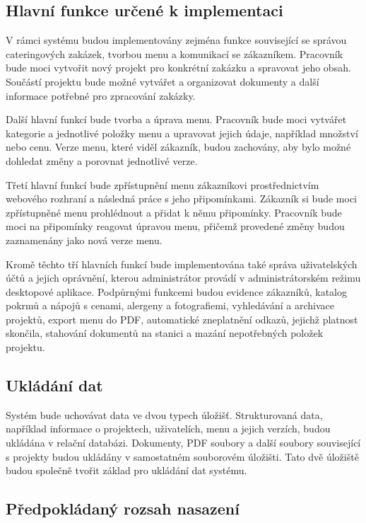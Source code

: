 \subsection{Hlavní funkce určené k implementaci}

V rámci systému budou implementovány zejména funkce související se správou cateringových zakázek, tvorbou menu a komunikací se zákazníkem. Pracovník bude moci vytvořit nový projekt pro konkrétní zakázku a spravovat jeho obsah. Součástí projektu bude možné vytvářet a organizovat dokumenty a další informace potřebné pro zpracování zakázky.

Další hlavní funkcí bude tvorba a úprava menu. Pracovník bude moci vytvářet kategorie a jednotlivé položky menu a upravovat jejich údaje, například množství nebo cenu. Verze menu, které viděl zákazník, budou zachovány, aby bylo možné dohledat změny a porovnat jednotlivé verze.

Třetí hlavní funkcí bude zpřístupnění menu zákazníkovi prostřednictvím webového rozhraní a následná práce s jeho připomínkami. Zákazník si bude moci zpřístupněné menu prohlédnout a přidat k němu připomínky. Pracovník bude moci na připomínky reagovat úpravou menu, přičemž provedené změny budou zaznamenány jako nová verze menu.

Kromě těchto tří hlavních funkcí bude implementována také správa uživatelských účtů a jejich oprávnění, kterou administrátor provádí v administrátorském režimu desktopové aplikace. Podpůrnými funkcemi budou evidence zákazníků, katalog pokrmů a nápojů s cenami, alergeny a fotografiemi, vyhledávání a archivace projektů, export menu do PDF, automatické zneplatnění odkazů, jejichž platnost skončila, stahování dokumentů na stanici a mazání nepotřebných položek projektu.

\subsection{Ukládání dat}

Systém bude uchovávat data ve dvou typech úložišť. Strukturovaná data, například informace o projektech, uživatelích, menu a jejich verzích, budou ukládána v relační databázi. Dokumenty, PDF soubory a další soubory související s projekty budou ukládány v samostatném souborovém úložišti. Tato dvě úložiště budou společně tvořit základ pro ukládání dat systému.

\subsection{Předpokládaný rozsah nasazení}

